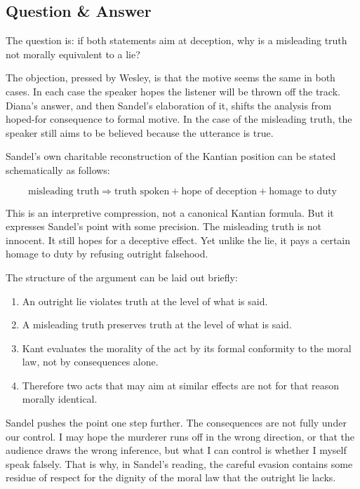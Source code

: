 \subsection{Question \& Answer}

The question is: if both statements aim at deception, why is a misleading truth not morally equivalent to a lie?

The objection, pressed by Wesley, is that the motive seems the same in both cases. In each case the speaker hopes the listener will be thrown off the track. Diana's answer, and then Sandel's elaboration of it, shifts the analysis from hoped-for consequence to formal motive. In the case of the misleading truth, the speaker still aims to be believed because the utterance is true.

Sandel's own charitable reconstruction of the Kantian position can be stated schematically as follows:

\begin{equation}
\text{misleading truth}
\Longrightarrow
\text{truth spoken} + \text{hope of deception} + \text{homage to duty}
\end{equation}

This is an interpretive compression, not a canonical Kantian formula. But it expresses Sandel's point with some precision. The misleading truth is not innocent. It still hopes for a deceptive effect. Yet unlike the lie, it pays a certain homage to duty by refusing outright falsehood.

The structure of the argument can be laid out briefly:

\begin{enumerate}
\item An outright lie violates truth at the level of what is said.
\item A misleading truth preserves truth at the level of what is said.
\item Kant evaluates the morality of the act by its formal conformity to the moral law, not by consequences alone.
\item Therefore two acts that may aim at similar effects are not for that reason morally identical.
\end{enumerate}

Sandel pushes the point one step further. The consequences are not fully under our control. I may hope the murderer runs off in the wrong direction, or that the audience draws the wrong inference, but what I can control is whether I myself speak falsely. That is why, in Sandel's reading, the careful evasion contains some residue of respect for the dignity of the moral law that the outright lie lacks.

